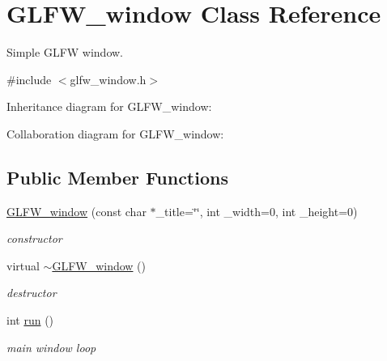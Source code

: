 \hypertarget{classGLFW__window}{}\section{G\+L\+F\+W\+\_\+window Class Reference}
\label{classGLFW__window}


Simple G\+L\+FW window.  




{\ttfamily \#include $<$glfw\+\_\+window.\+h$>$}



Inheritance diagram for G\+L\+F\+W\+\_\+window\+:


Collaboration diagram for G\+L\+F\+W\+\_\+window\+:
\subsection*{Public Member Functions}
\begin{DoxyCompactItemize}
\item 
\hyperlink{classGLFW__window_ac02ae290228702da2ded0e810b2e201d}{G\+L\+F\+W\+\_\+window} (const char $\ast$\+\_\+title=\char`\"{}\char`\"{}, int \+\_\+width=0, int \+\_\+height=0)
\begin{DoxyCompactList}\small\item\em constructor \end{DoxyCompactList}\item 
virtual \hyperlink{classGLFW__window_a4ac7294a25f64fcb6dbb640767ad3022}{$\sim$\+G\+L\+F\+W\+\_\+window} ()
\begin{DoxyCompactList}\small\item\em destructor \end{DoxyCompactList}\item 
int \hyperlink{classGLFW__window_a9d48023a3e8659231872e7a163924ee1}{run} ()
\begin{DoxyCompactList}\small\item\em main window loop \end{DoxyCompactList}\end{DoxyCompactItemize}
